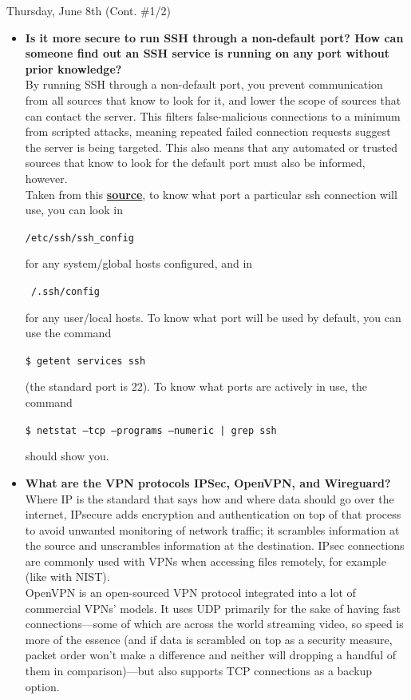\documentclass[11pt]{article}
\newcommand\codebox[1]{
    \noindent\hspace{-0.25em}\begin{tcolorbox}[on line, hbox, colback = codeblack, colframe = codeborder, coltext = white, boxrule = 1.5pt, left = 2pt, right = 2pt, top = 0.5pt, bottom = 0.5pt]
    \small\texttt{#1}\normalsize
    \end{tcolorbox}\hspace{-0.25em}
}
\begin{document}
\begin{orangebox}{Thursday, June 8th (Cont. \#1/2)\vspace{-2em}\begin{flushright}\end{flushright}}
\begin{itemize}
    \item\textbf{Is it more secure to run SSH through a non-default port? How can someone find out an SSH service is running on any port without prior knowledge?} \\
    \phantom{~~~~} By running SSH through a non-default port, you prevent communication from all sources that know to look for it, and lower the scope of sources that can contact the server. This filters false-malicious connections to a minimum from scripted attacks, meaning repeated failed connection requests suggest the server is being targeted. This also means that any automated or trusted sources that know to look for the default port must also be informed, however. \\
    \phantom{~~~~} Taken from this \href{https://unix.stackexchange.com/questions/539882/find-which-port-does-ssh-client-used-to-send-connection-request}{\textbf{source}}, to know what port a particular ssh connection will use, you can look in \codebox{/etc/ssh/ssh\_config} for any system/global hosts configured, and in \codebox{~/.ssh/config} for any user/local hosts. To know what port will be used by default, you can use the command \codebox{\$ getent services ssh} (the standard port is 22). To know what ports are actively in use, the command \codebox{\$ netstat --tcp --programs --numeric | grep ssh} should show you.
    \item\textbf{What are the VPN protocols IPSec, OpenVPN, and Wireguard?} \\
    \phantom{~~~~} Where IP is the standard that says how and where data should go over the internet, IPsecure adds encryption and authentication on top of that process to avoid unwanted monitoring of network traffic; it scrambles information at the source and unscrambles information at the destination. IPsec connections are commonly used with VPNs when accessing files remotely, for example (like with NIST). \\
    \phantom{~~~~} OpenVPN is an open-sourced VPN protocol integrated into a lot of commercial VPNs' models. It uses UDP primarily for the sake of having fast connections---some of which are across the world streaming video, so speed is more of the essence (and if data is scrambled on top as a security measure, packet order won't make a difference and neither will dropping a handful of them in comparison)---but also supports TCP connections as a backup option. \\

\end{itemize}
\end{orangebox}
\end{document}
